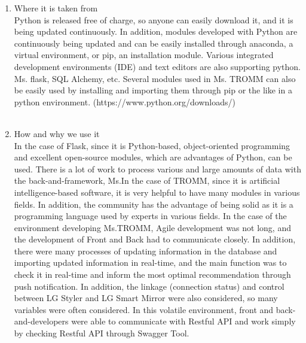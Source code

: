 \documentclass[conference]{IEEEtran}
\begin{document}
\begin{enumerate}
    \item Where it is taken from\\
    Python is released free of charge, so anyone can easily download it, and it is being updated continuously. In addition, modules developed with Python are continuously being updated and can be easily installed through anaconda, a virtual environment, or pip, an installation module. Various integrated development environments (IDE) and text editors are also supporting python. Ms. flask, SQL Alchemy, etc. Several modules used in Ms. TROMM can also be easily used by installing and importing them through pip or the like in a python environment. (https://www.python.org/downloads/) \\ \\
    \item How and why we use it\\
    In the case of Flask, since it is Python-based, object-oriented programming and excellent open-source modules, which are advantages of Python, can be used. There is a lot of work to process various and large amounts of data with the back-and-framework, Ms.In the case of TROMM, since it is artificial intelligence-based software, it is very helpful to have many modules in various fields. In addition, the community has the advantage of being solid as it is a programming language used by experts in various fields. In the case of the environment developing Ms.TROMM, Agile development was not long, and the development of Front and Back had to communicate closely. In addition, there were many processes of updating information in the database and importing updated information in real-time, and the main function was to check it in real-time and inform the most optimal recommendation through push notification. In addition, the linkage (connection status) and control between LG Styler and LG Smart Mirror were also considered, so many variables were often considered. In this volatile environment, front and back-and-developers were able to communicate with Restful API and work simply by checking Restful API through Swagger Tool. \\ \\
\end{enumerate}
\end{document}
